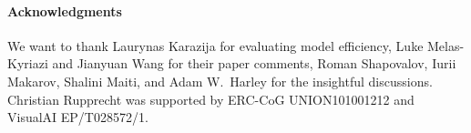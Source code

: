 \paragraph*{Acknowledgments}

We want to thank Laurynas Karazija for evaluating model efficiency, Luke Melas-Kyriazi and Jianyuan Wang for their paper comments, Roman Shapovalov, Iurii Makarov, Shalini Maiti, and Adam W.~Harley for the insightful discussions.
Christian Rupprecht was supported by ERC-CoG UNION101001212 and VisualAI EP/T028572/1.